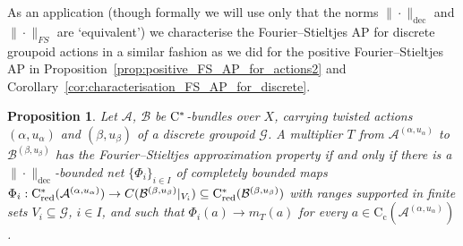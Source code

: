 \documentclass[11 pt, leqno]{amsart}
\numberwithin{equation}{section}
\theoremstyle{plain}
\newtheorem {prop}[thm] {Proposition}
\theoremstyle{definition}
\newcommand*{\contc}{\mathrm{C_c}}%
\DeclareMathOperator{\red}{red}%
\newcommand{\B}{\mathcal B}
\newcommand{\G}{\mathcal G} %
\newcommand{\A}{\mathcal A}
\newcommand{\cst}{\ifmmode\mathrm{C}^*\else{$\mathrm{C}^*$}\fi}
\begin{document}
As an application (though formally we will use only that the norms $\| \cdot \|_{\mathrm{dec}}$ and $\|\cdot\|_{FS}$ are `equivalent') we characterise the Fourier--Stieltjes AP for discrete groupoid actions in a similar fashion as we did for the positive Fourier--Stieltjes AP in Proposition~\ref{prop:positive_FS_AP_for_actions2} 
and Corollary~\ref{cor:characterisation_FS_AP_for_discrete}.

\begin{prop}\label{prop:FS_AP_for_actions2} 
Let $\A$, $\B$ be $\cst$-bundles over $X$, carrying twisted actions $(\alpha,u_\alpha)$ and $(\beta,u_\beta)$ of a discrete groupoid $\G$. 
A multiplier $T$ from $\A^{(\alpha,u_{\alpha})}$ to $\B^{(\beta,u_{\beta})}$ has the Fourier--Stieltjes approximation property if and only if there is a $\| \cdot \|_{\mathrm{dec}}$-bounded net $\{\Phi_{i}\}_{i\in I}$ of completely bounded maps $\Phi_i : \cst_{\red}(\A^{(\alpha,u_\alpha)}) \to C(\B^{(\beta,u_\beta)} |_{V_i}) \subseteq \cst_{\red}(\B^{(\beta,u_\beta)})$ with ranges supported in finite sets $V_i\subseteq \G$, $i\in I$, and such that $\Phi_i(a)\to m_T(a)$ for every $a\in \contc(\A^{(\alpha,u_\alpha)})$.
\end{prop}
\end{document}
